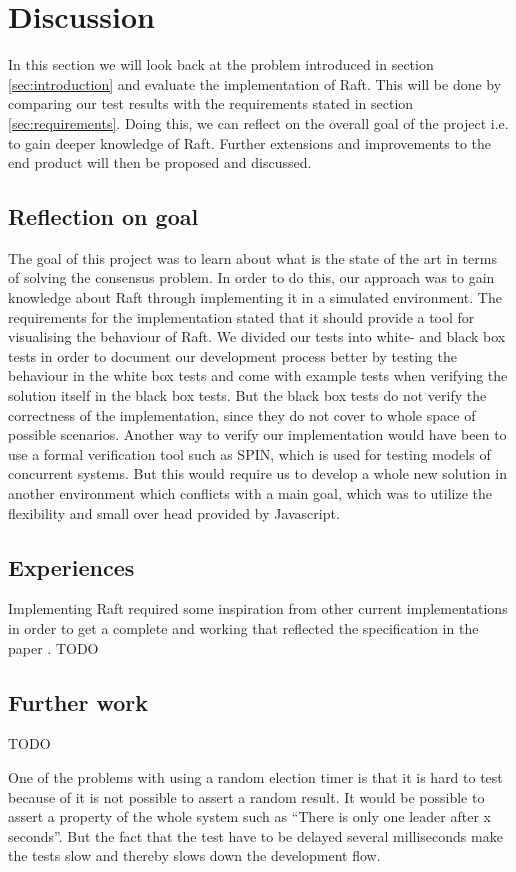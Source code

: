 \section{Discussion} %
\label{sec:discussion}
In this section we will look back at the problem introduced in section \ref{sec:introduction} and evaluate the implementation of Raft. This will be done by comparing our test results with the requirements stated in section \ref{sec:requirements}. Doing this, we can reflect on the overall goal of the project i.e. to gain deeper knowledge of Raft. Further extensions and improvements to the end product will then be proposed and discussed.

\subsection{Reflection on goal}
The goal of this project was to learn about what is the state of the art in terms of solving the consensus problem. In order to do this, our approach was to gain knowledge about Raft through implementing it in a simulated environment. 
The requirements for the implementation stated that it should provide a tool for visualising the behaviour of Raft. 
We divided our tests into white- and black box tests in order to document our development process better by testing the behaviour in the white box tests and come with example tests when verifying the solution itself in the black box tests. But the black box tests do not verify the correctness of the implementation, since they do not cover to whole space of possible scenarios. Another way to verify our implementation would have been to use a formal verification tool such as SPIN, which is used for testing models of concurrent systems. But this would require us to develop a whole new solution in another environment which conflicts with a main goal, which was to utilize the flexibility and small over head provided by Javascript.

\subsection{Experiences}
Implementing Raft required some inspiration from other current implementations in order to get a complete and working that reflected the specification in the paper \cite{Raft}. TODO
\subsection{Further work}
TODO

One of the problems with using a random election timer is that it is hard to test because of it is not possible to assert a random result. It would be possible to assert a property of the whole system such as ``There is only one leader after x seconds''. But the fact that the test have to be delayed several milliseconds make the tests slow and thereby slows down the development flow.




